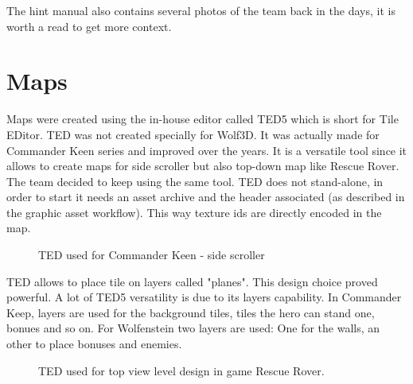 \documentclass[book.tex]{subfiles}
\begin{document}
     \begin{figure}[H]
\centering
   \end{figure}


\par 
The hint manual also contains several photos of the team back in the days, it is worth a read to get more context.













\section{Maps}
Maps were created using the in-house editor called TED5 which is short for Tile EDitor. TED was not created specially for Wolf3D. It was actually made for Commander Keen series and improved over the years. It is a versatile tool since it allows to create maps for side scroller but also top-down map like Rescue Rover. The team decided to keep using the same tool. TED does not stand-alone, in order to start it needs an asset archive and the header associated (as described in the graphic asset workflow). This way texture ids are directly encoded in the map.\\

 \begin{figure}[H]
\centering
 \end{figure}

  \begin{figure}[H]
\centering
 \end{figure}


 \begin{figure}[H]
\centering
 \caption{TED used for Commander Keen - side scroller} 
 \end{figure}

TED allows to place tile on layers called "planes". This design choice proved powerful. A lot of TED5 versatility is due to its layers capability. In Commander Keep, layers are used for the background tiles, tiles the hero can stand one, bonues and so on. For Wolfenstein two layers are used: One for the walls, an other to place bonuses and enemies.\\
\begin{figure}[H]
\centering
 \caption{TED used for top view level design in game Rescue Rover.} 
 \end{figure}
\end{document}
